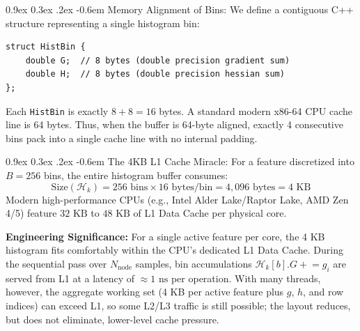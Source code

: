\documentclass[11pt,a4paper]{article}
\makeatletter
\renewcommand\paragraph{\@startsection{paragraph}{4}{\z@}%
                                     {0.9ex \@plus0.3ex \@minus.2ex}%
                                     {-0.6em}%
                                     {\normalfont\normalsize\bfseries}}
\makeatother
\begin{document}
\paragraph{Memory Alignment of Bins:}
We define a contiguous C++ structure representing a single histogram bin:
\begin{verbatim}
struct HistBin {
    double G;  // 8 bytes (double precision gradient sum)
    double H;  // 8 bytes (double precision hessian sum)
};
\end{verbatim}
Each \texttt{HistBin} is exactly $8 + 8 = 16$ bytes. A standard modern x86-64 CPU cache line is 64 bytes. Thus, when the buffer is 64-byte aligned, exactly 4 consecutive bins pack into a single cache line with no internal padding.

\paragraph{The 4KB L1 Cache Miracle:}
For a feature discretized into $B = 256$ bins, the entire histogram buffer consumes:
\begin{equation}
    \text{Size}(\mathcal{H}_k) = 256 \text{ bins} \times 16 \text{ bytes/bin} = 4{,}096 \text{ bytes} = 4 \text{ KB}
\end{equation}
Modern high-performance CPUs (e.g., Intel Alder Lake/Raptor Lake, AMD Zen 4/5) feature $32 \text{ KB}$ to $48 \text{ KB}$ of L1 Data Cache per physical core.

\textbf{Engineering Significance:} For a single active feature per core, the 4 KB histogram fits comfortably within the CPU's dedicated L1 Data Cache. During the sequential pass over $N_{\text{node}}$ samples, bin accumulations $\mathcal{H}_k[b].G \mathrel{+}= g_i$ are served from L1 at a latency of $\approx 1 \text{ ns}$ per operation. With many threads, however, the aggregate working set (4 KB per active feature plus $g$, $h$, and row indices) can exceed L1, so some L2/L3 traffic is still possible; the layout reduces, but does not eliminate, lower-level cache pressure.
\end{document}
